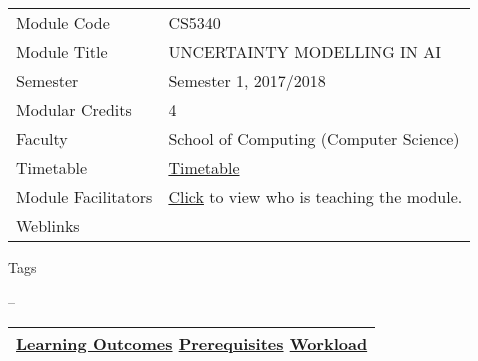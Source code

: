 \hypertarget{ctl00_ctl00_ContentPlaceHolder1_ContentPlaceHolder1_LV_itemPlaceholderContainer}{}
\begin{longtable}[]{@{}ll@{}}
\toprule
\protect\hypertarget{ctl00_ctl00_ContentPlaceHolder1_ContentPlaceHolder1_LV_ctrl0_txtCode}{}{Module
Code} &
\protect\hypertarget{ctl00_ctl00_ContentPlaceHolder1_ContentPlaceHolder1_LV_ctrl0_lcCode}{}{CS5340}\tabularnewline
\protect\hypertarget{ctl00_ctl00_ContentPlaceHolder1_ContentPlaceHolder1_LV_ctrl0_lcCourse}{}{Module
Title} &
\protect\hypertarget{ctl00_ctl00_ContentPlaceHolder1_ContentPlaceHolder1_LV_ctrl0_lcCourseName}{}{UNCERTAINTY
MODELLING IN AI}\tabularnewline
\protect\hypertarget{ctl00_ctl00_ContentPlaceHolder1_ContentPlaceHolder1_LV_ctrl0_lcSemester}{}{Semester}
&
\protect\hypertarget{ctl00_ctl00_ContentPlaceHolder1_ContentPlaceHolder1_LV_ctrl0_lcSem}{}{Semester
1, 2017/2018}\tabularnewline
\protect\hypertarget{ctl00_ctl00_ContentPlaceHolder1_ContentPlaceHolder1_LV_ctrl0_lcModCredit}{}{Modular
Credits} &
\protect\hypertarget{ctl00_ctl00_ContentPlaceHolder1_ContentPlaceHolder1_LV_ctrl0_lcModC}{}{4}\tabularnewline
\protect\hypertarget{ctl00_ctl00_ContentPlaceHolder1_ContentPlaceHolder1_LV_ctrl0_lcFaculty}{}{Faculty}
&
\protect\hypertarget{ctl00_ctl00_ContentPlaceHolder1_ContentPlaceHolder1_LV_ctrl0_lcFac}{}{School
of Computing (Computer Science)}\tabularnewline
\protect\hypertarget{ctl00_ctl00_ContentPlaceHolder1_ContentPlaceHolder1_LV_ctrl0_Label1}{}{Timetable}
&
\protect\hypertarget{ctl00_ctl00_ContentPlaceHolder1_ContentPlaceHolder1_LV_ctrl0_Span1}{}{\href{javascript:void(0);}{Timetable}}\tabularnewline
\protect\hypertarget{ctl00_ctl00_ContentPlaceHolder1_ContentPlaceHolder1_LV_ctrl0_Label6}{}{Module
Facilitators} &
\protect\hypertarget{ctl00_ctl00_ContentPlaceHolder1_ContentPlaceHolder1_LV_ctrl0_Span2}{}{\href{list_lecturers.aspx?CourseID=5d29ef6a-a9e5-4940-ab31-883a8f2a5b45\&ClickFrom=}{Click}
to view who is teaching the module.}\tabularnewline
\protect\hypertarget{ctl00_ctl00_ContentPlaceHolder1_ContentPlaceHolder1_LV_ctrl0_LabelCtrl1}{}{Weblinks}
&\tabularnewline
\bottomrule
\end{longtable}

\protect\hypertarget{ctl00_ctl00_ContentPlaceHolder1_ContentPlaceHolder1_LV_ctrl0_Label4}{}{Tags}

\protect\hypertarget{ctl00_ctl00_ContentPlaceHolder1_ContentPlaceHolder1_LV_ctrl0_lblTags}{}{--}

\begin{longtable}[]{@{}l@{}}
\toprule
\protect\hypertarget{ctl00_ctl00_ContentPlaceHolder1_ContentPlaceHolder1_lblSectionMiddle}{}{\protect\hyperlink{Learningux5cux2520Outcomes}{Learning
Outcomes} \textbar{} \protect\hyperlink{Prerequisites}{Prerequisites}
\textbar{} \protect\hyperlink{Workload}{Workload}}\tabularnewline
\bottomrule
\end{longtable}

